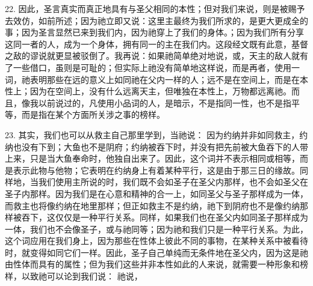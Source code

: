 22. 因此，圣言真实而真正地具有与圣父相同的本性；但对我们来说，则是被赐予去效仿，如前所述；因为祂立即又说：这里主最终为我们所求的，是更大更成全的事；因为圣言显然已来到我们内，因为祂穿上了我们的身体。；因为我们所有分享这同一者的人，成为一个身体，拥有同一的主在我们内。这段经文既有此意，基督之敌的谬说就更显被驳倒了。我再说：如果祂简单绝对地说，或，天主的敌人就有了一些借口，虽则是可耻的；但实际上祂没有简单地这样说，而是再者，使用一词，祂表明那些在远的意义上如同祂在父内一样的人；远不是在空间上，而是在本性上；因为在空间上，没有什么远离天主，但唯独在本性上，万物都远离祂。而且，像我以前说过的，凡使用小品词的人，是暗示，不是指同一性，也不是指平等，而是指在某个方面所关涉之事的榜样。\par

23. 其实，我们也可以从救主自己那里学到，当祂说：  因为约纳并非如同救主，约纳也没有下到；大鱼也不是阴府；约纳被吞下时，并没有把先前被大鱼吞下的人带上来，只是当大鱼奉命时，他独自出来了。因此，这个词并不表示相同或相等，而是表示此物与他物；它表明在约纳身上有着某种平行，这是由于那三日的缘故。同样地，当我们使用主所说的时，我们既不会如圣子在圣父内那样，也不会如圣父在圣子内那样。因为我们是在心意和精神的合一上，如同圣父与圣子那样成为一体，而救主也将像约纳在地里那样；但正如救主不是约纳，祂下到阴府也不是像约纳那样被吞下，这仅仅是一种平行关系。同样，如果我们也在圣父内如同圣子那样成为一体，我们也不会像圣子，或与祂同等；因为祂和我们只是一种平行关系。为此，这个词应用在我们身上，因为那些在性体上彼此不同的事物，在某种关系中被看待时，就变得如同它们一样。因此，圣子自己单纯而无条件地在圣父内，因为这是祂由性体而具有的属性；但为我们这些并非本性如此的人来说，就需要一种形象和榜样，以致祂可以论到我们说：  祂说，\par

